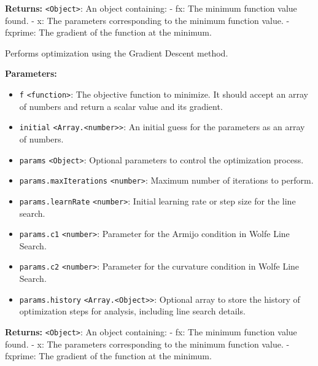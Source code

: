 \documentclass[12pt,a4paper]{article}
\begin{document}
\noindent \textbf{Returns:} \texttt{<Object>}: An object containing:
  - \textasciigrave{}fx\textasciigrave{}: The minimum function value found.
  - \textasciigrave{}x\textasciigrave{}: The parameters corresponding to the minimum function value.
  - \textasciigrave{}fxprime\textasciigrave{}: The gradient of the function at the minimum.

\noindent Performs optimization using the Gradient Descent method.

\vspace{5mm}
\noindent {}


\noindent \textbf{Parameters:}
\begin{itemize}
  \item \texttt{f} \texttt{<function>}: The objective function to minimize. It should accept an array of numbers and return a scalar value and its gradient.
  \item \texttt{initial} \texttt{<Array.<number>>}: An initial guess for the parameters as an array of numbers.
  \item \texttt{params} \texttt{<Object>}: Optional parameters to control the optimization process.
  \item \texttt{params.maxIterations} \texttt{<number>}: Maximum number of iterations to perform.
  \item \texttt{params.learnRate} \texttt{<number>}: Initial learning rate or step size for the line search.
  \item \texttt{params.c1} \texttt{<number>}: Parameter for the Armijo condition in Wolfe Line Search.
  \item \texttt{params.c2} \texttt{<number>}: Parameter for the curvature condition in Wolfe Line Search.
  \item \texttt{params.history} \texttt{<Array.<Object>>}: Optional array to store the history of optimization steps for analysis, including line search details.
\end{itemize}

\noindent \textbf{Returns:} \texttt{<Object>}: An object containing:
  - \textasciigrave{}fx\textasciigrave{}: The minimum function value found.
  - \textasciigrave{}x\textasciigrave{}: The parameters corresponding to the minimum function value.
  - \textasciigrave{}fxprime\textasciigrave{}: The gradient of the function at the minimum.
\end{document}
